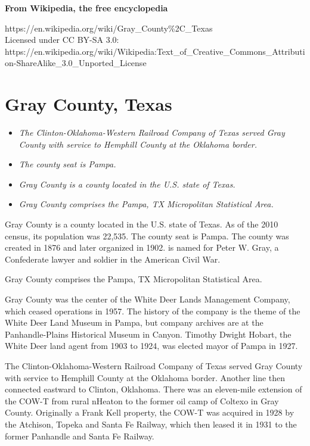 \textbf{From Wikipedia, the free encyclopedia}

https://en.wikipedia.org/wiki/Gray\_County\%2C\_Texas\\
Licensed under CC BY-SA 3.0:\\
https://en.wikipedia.org/wiki/Wikipedia:Text\_of\_Creative\_Commons\_Attribution-ShareAlike\_3.0\_Unported\_License

\section{Gray County, Texas}\label{gray-county-texas}

\begin{itemize}
\item
  \emph{The Clinton-Oklahoma-Western Railroad Company of Texas served
  Gray County with service to Hemphill County at the Oklahoma border.}
\item
  \emph{The county seat is Pampa.}
\item
  \emph{Gray County is a county located in the U.S. state of Texas.}
\item
  \emph{Gray County comprises the Pampa, TX Micropolitan Statistical
  Area.}
\end{itemize}

Gray County is a county located in the U.S. state of Texas. As of the
2010 census, its population was 22,535. The county seat is Pampa. The
county was created in 1876 and later organized in 1902. is named for
Peter W. Gray, a Confederate lawyer and soldier in the American Civil
War.

Gray County comprises the Pampa, TX Micropolitan Statistical Area.

Gray County was the center of the White Deer Lands Management Company,
which ceased operations in 1957. The history of the company is the theme
of the White Deer Land Museum in Pampa, but company archives are at the
Panhandle-Plains Historical Museum in Canyon. Timothy Dwight Hobart, the
White Deer land agent from 1903 to 1924, was elected mayor of Pampa in
1927.

The Clinton-Oklahoma-Western Railroad Company of Texas served Gray
County with service to Hemphill County at the Oklahoma border. Another
line then connected eastward to Clinton, Oklahoma. There was an
eleven-mile extension of the COW-T from rural nHeaton to the former oil
camp of Coltexo in Gray County. Originally a Frank Kell property, the
COW-T was acquired in 1928 by the Atchison, Topeka and Santa Fe Railway,
which then leased it in 1931 to the former Panhandle and Santa Fe
Railway.

